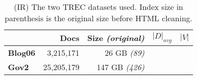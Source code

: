 \begin{table}
\centering
{\small
\begin{tabular}{|l|r|r|r|r|}
    \hline & \textbf{Docs} & \textbf{Size} \emph{(original)} & \textbf{$|D|_{avg}$} &
    \textbf{$|V|$} \\
    \hline
    \textbf{Blog06} & 3,215,171 & 26 GB \emph{(89)} & & \\
    \textbf{Gov2} & 25,205,179 & 147 GB \emph{(426)} & & \\
    \hline
\end{tabular}
\caption{(IR) The two TREC datasets used. Index size in parenthesis is the
original size before HTML cleaning.}
}
\label{table:ir-datasets}
\end{table}
